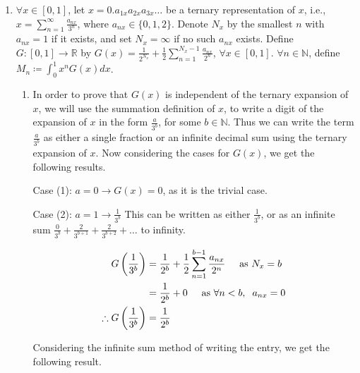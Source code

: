\documentclass[a4paper]{article}
\begin{document}
\begin{enumerate}[label=\textbf{\arabic*.}]
\begin{enumerate}
	\end{enumerate}

	\pagebreak

	\item $\forall x \in [0,1]$, let $x = 0.a_{1x}a_{2x}a_{3x}\dots$ be a ternary representation of $x$, i.e., $x = \displaystyle{\sum_{n=1}^{\infty}\frac{a_{nx}}{3^{n}}}$, where $a_{nx} \in \{0,1,2\}$. Denote $N_x$ by the smallest $n$ with $a_{nx} = 1$ if it exists, and set $N_x = \infty$ if no such $a_{nx}$ exists. Define $G:[0,1] \rightarrow \mathbb{R}$ by $G(x) = \displaystyle{\frac{1}{2^{N_x}} + \frac{1}{2}\sum_{n=1}^{N_x-1}\frac{a_{nx}}{2^{n}}}$, $\forall x \in [0,1]$. $\forall n \in \mathbb{N}$, define $M_n \coloneqq \displaystyle{\int_{0}^{1}x^{n}G(x)dx}$.

	\begin{enumerate}
		\item In order to prove that $G(x)$ is independent of the ternary expansion of $x$, we will use the summation definition of $x$, to write a digit of the expansion of $x$ in the form $\displaystyle{\frac{a}{3^b}}$, for some $b \in \mathbb{N}$. Thus we can write the term $\displaystyle{\frac{a}{3^b}}$ as either a single fraction or an infinite decimal sum using the ternary expansion of $x$. Now considering the cases for $G(x)$, we get the following results.

		\bigbreak

		Case (1): $\displaystyle{a = 0 \rightarrow G(x) = 0}$, as it is the trivial case.

		\bigbreak

		Case (2): $\displaystyle{a = 1 \rightarrow \frac{1}{3^b}}$ This can be written as either $\displaystyle{\frac{1}{3^b}}$, or as an infinite sum $\displaystyle{\frac{0}{3^b} + \frac{2}{3^{b+1}} + \frac{2}{3^{b+2}} + \dots}$ to infinity. 

		\begin{align*}
		G\left(\frac{1}{3^b}\right) & = \frac{1}{2^b} + \frac{1}{2}\sum_{n=1}^{b-1}\frac{a_{nx}}{2^n} \hspace{5mm} \text{as } N_x = b\\
		& = \frac{1}{2^b} + 0 \hspace{5mm} \text{as } \forall n < b, \hspace{2mm} a_{nx} = 0\\
		\therefore G\left(\frac{1}{3^b}\right) & = \frac{1}{2^b}\\
		\end{align*}

		Considering the infinite sum method of writing the entry, we get the following result.


\end{enumerate}
\end{enumerate}
\end{document}

